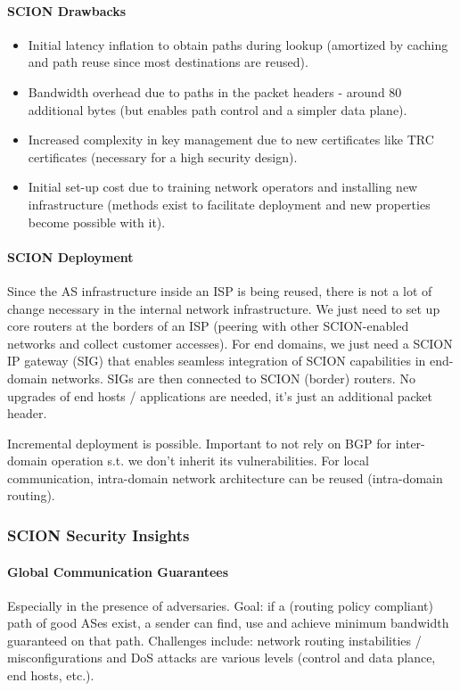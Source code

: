 \paragraph{SCION Drawbacks}

\begin{itemize}
    \item Initial latency inflation to obtain paths during lookup (amortized by caching and path reuse since most destinations are reused).
    \item Bandwidth overhead due to paths in the packet headers - around 80 additional bytes (but enables path control and a simpler data plane).
    \item Increased complexity in key management due to new certificates like TRC certificates (necessary for a high security design).
    \item Initial set-up cost due to training network operators and installing new infrastructure (methods exist to facilitate deployment and new properties become possible with it).
\end{itemize}

\paragraph{SCION Deployment}
Since the AS infrastructure inside an ISP is being reused, there is not a lot of change necessary in the internal network infrastructure. We just need to set up core routers at the borders of an ISP (peering with other SCION-enabled networks and collect customer accesses). For end domains, we just need a SCION IP gateway (SIG) that enables seamless integration of SCION capabilities in end-domain networks. SIGs are then connected to SCION (border) routers. No upgrades of end hosts / applications are needed, it's just an additional packet header.

Incremental deployment is possible. Important to not rely on BGP for inter-domain operation s.t. we don't inherit its vulnerabilities. For local communication, intra-domain network architecture can be reused (intra-domain routing).


\subsubsection{SCION Security Insights}

\paragraph{Global Communication Guarantees}
Especially in the presence of adversaries. Goal: if a (routing policy compliant) path of good ASes exist, a sender can find, use and achieve minimum bandwidth guaranteed on that path. Challenges include: network routing instabilities / misconfigurations and DoS attacks are various levels (control and data plance, end hosts, etc.).

